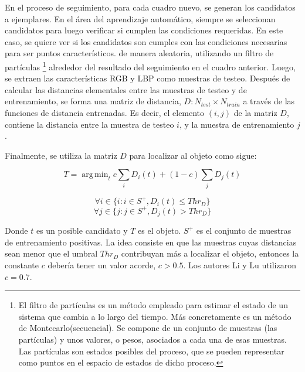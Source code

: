 \documentclass[a4paper,10pt]{article}
\DeclareMathOperator*{\argmin}{arg\,min}
\begin{document}
En el proceso de seguimiento, para cada cuadro nuevo, se generan los
candidatos a ejemplares. En el área del aprendizaje automático, siempre se seleccionan candidatos
para luego verificar si cumplen las condiciones requeridas. En este caso, se quiere ver si los candidatos son 
cumples con las condiciones necesarias para ser puntos característicos.
 de manera aleatoria, utilizando un filtro de partículas 
\footnote{El filtro de partículas es un método empleado para estimar el estado de un sistema que cambia a lo largo del tiempo. Más 
concretamente es un método de Montecarlo(secuencial). Se compone de un conjunto de muestras (las partículas) y unos valores, o pesos, 
asociados a cada una de esas muestras. Las partículas son estados posibles del proceso, que se pueden representar como puntos en el espacio 
de estados de dicho proceso.}
alrededor del resultado del 
seguimiento en el cuadro anterior. Luego, se extraen las características
RGB y LBP como muestras de testeo. Después de calcular las distancias
elementales entre las muestras de testeo y de entrenamiento, se 
forma una matriz de distancia, $D: N_{test} \times N_{train}$ a través
de las funciones de distancia entrenadas. Es decir, el elemento $(i,j)$ de la matriz $D$, contiene la distancia
entre la muestra de testeo $i$, y la muestra de entrenamiento $j$.

Finalmente, se utiliza la matriz $D$ para localizar al objeto como sigue:

\begin{equation}
    T = \argmin_{t} c \sum_{i} D_{i}(t) + (1 - c) \sum_{j} D_{j}(t)
\end{equation}

\begin{equation}
    \forall i \in \{i : i \in S^{+}, D_{i}(t) \leq Thr_{D} \}
\end{equation}
\begin{equation}
    \forall j \in \{j : j \in S^{+}, D_{j}(t) > Thr_{D} \}
\end{equation}

Donde $t$ es un posible candidato y $T$ es el objeto. $S^{+}$ es el 
conjunto de muestras de entrenamiento positivas. La idea consiste en 
que las muestras cuyas distancias sean menor que el umbral $Thr_{D}$
contribuyan más a localizar el objeto, entonces la constante $c$ 
debería tener un valor acorde, $c > 0.5$. Los autores Li y Lu utilizaron $c = 0.7$.\cite{local-learning}\\
\end{document}
